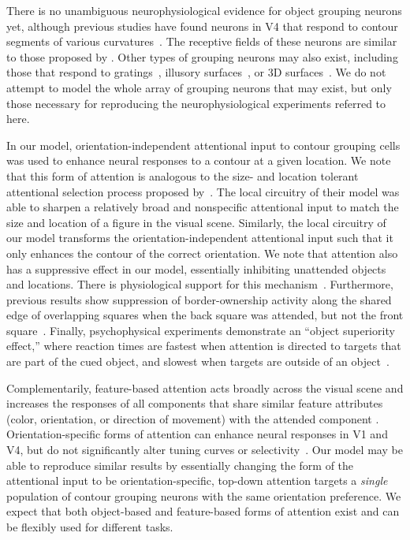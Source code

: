 There is no unambiguous neurophysiological evidence for object grouping
neurons yet, although previous studies have found neurons in V4 that
respond to contour segments of various
curvatures~\citep{Pasupathy_Connor02,Brincat_Connor04}. The receptive
fields of these neurons are similar to those proposed
 by \cite{Craft_etal07}. Other types of grouping neurons may also exist,
including those that respond to gratings~\citep{Hegde_vanEssen07},
illusory surfaces~\citep{Cox_etal13}, or 3D
surfaces~\citep{He_Nakayama95,Hu_etal15a}.  We do not attempt to model
the whole array of grouping neurons that may exist, but only those
necessary for reproducing the neurophysiological experiments referred
to here.

In our model, orientation-independent attentional input to contour
grouping cells was used to enhance neural responses to a contour at a
given location.  We note that this form of attention is analogous to
the size- and location tolerant attentional selection process proposed
by~\cite{Mihalas_etal11b}. The local circuitry of their model was able
to sharpen a relatively broad and nonspecific attentional input to
match the size and location of a figure in the visual
scene. Similarly, the local circuitry of our model transforms the
orientation-independent attentional input such that it only enhances
the contour of the correct orientation. We note that attention also has a suppressive effect in our model, essentially inhibiting unattended objects and locations. 
There is physiological support for this mechanism~\citep{Wegener_etal04,Hopf_etal06,Sundberg_etal09,Tsotsos11}. Furthermore, previous results show
suppression of border-ownership activity along the shared edge of
overlapping squares when the back square was attended, but not the
front square~\citep{Qiu_etal07}. Finally, psychophysical
experiments demonstrate an ``object superiority effect,'' where
reaction times are fastest when attention is directed to targets that
are part of the cued object, and slowest when targets are outside of
an object~\citep{Egly_etal94,Kimchi_etal07}. 

Complementarily, feature-based attention acts broadly across the
visual scene and increases the responses of all components that share
similar feature attributes (\eg color, orientation, or direction of
movement) with the attended
component \citep{Motter94a,Treue_Trujillo99}.
Orientation-specific forms of attention
can enhance neural
responses in V1 and V4, but do not significantly alter
tuning curves or selectivity~\citep{McAdams_Maunsell99a}. 
Our model may be able to reproduce similar results by essentially changing the
form of the attentional input to be orientation-specific, \ie top-down
attention targets a \emph{single} population of contour grouping
neurons with the same orientation preference.
We expect that both
object-based and feature-based forms of attention exist and can be
flexibly used for different tasks.

